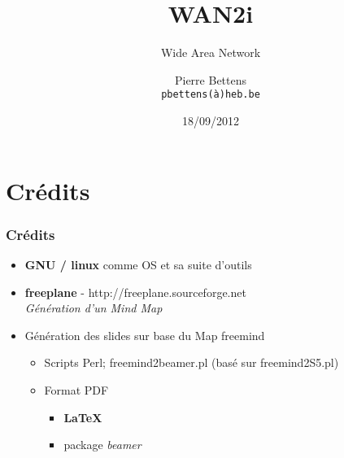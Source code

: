 \documentclass[a4paper,compress,13pt]{beamer}
\title{WAN2i}%
\subtitle{Wide Area Network}
\author[Pierre {\sc Bettens}]{Pierre {\sc Bettens} \\ \small \texttt{pbettens(\`a)heb.be}}
\institute{ÉSI - École Supérieure d'Informatique}
\date{18/09/2012}
\begin{document}
\begin{frame}[fragile]
	\titlepage
\end{frame}










\section{Crédits}

\begin{frame}[fragile]
  \frametitle{Crédits}
\begin{itemize}
	\item \textbf{GNU / linux} comme OS et sa suite d'outils
	\item \textbf{freeplane} - http://freeplane.sourceforge.net  \\ 
	\textit{Génération d'un Mind Map}
	\item Génération des slides sur base du Map freemind 
	\begin{itemize}
		\item Scripts Perl; freemind2beamer.pl (basé sur freemind2S5.pl)
		\item Format PDF
		\begin{itemize}
			\item \textbf{ \LaTeX }
			\item package \textit{beamer} 
		\end{itemize}
	\end{itemize}
\end{itemize}
\end{frame}
\end{document}
